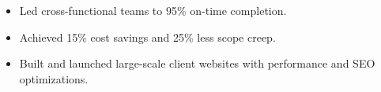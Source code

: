 \vspace{4pt}
\begin{itemize}
  \item Led cross-functional teams to 95\% on-time completion.
  \item Achieved 15\% cost savings and 25\% less scope creep.
\end{itemize}
\vspace{4pt}
\begin{itemize}
  \item Built and launched large-scale client websites with performance and SEO optimizations.
\end{itemize}
